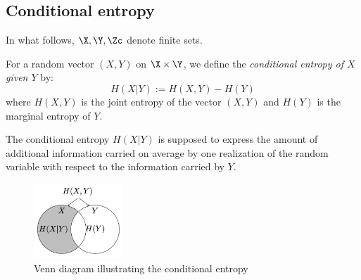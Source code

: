 \documentclass[toc, titlepaged]{../cs-classes/cs-classes}
\begin{document}
\subsection{Conditional entropy}
In what follows, $\X, \Y, \Zc$ denote finite sets.

\begin{definition}
    For a random vector $(X, Y)$ on $\X\times\Y$, we define the \emph{conditional entropy of $X$ given $Y$} by:
    \begin{equation*}
        H(X|Y) := H(X, Y)-H(Y)
    \end{equation*}
    where $H(X, Y)$ is the joint entropy of the vector $(X, Y)$ and $H(Y)$ is the marginal entropy of $Y$.
\end{definition}

The conditional entropy $H(X|Y)$ is supposed to express the amount of additional information carried on average by one realization of the random variable with respect to the information carried by $Y$.
\begin{figure}[H]
    \centering
    \includegraphics[width=0.3\textwidth]{images/conditional-entropy.png}
    \caption{Venn diagram illustrating the conditional entropy}
\end{figure}
\end{document}
